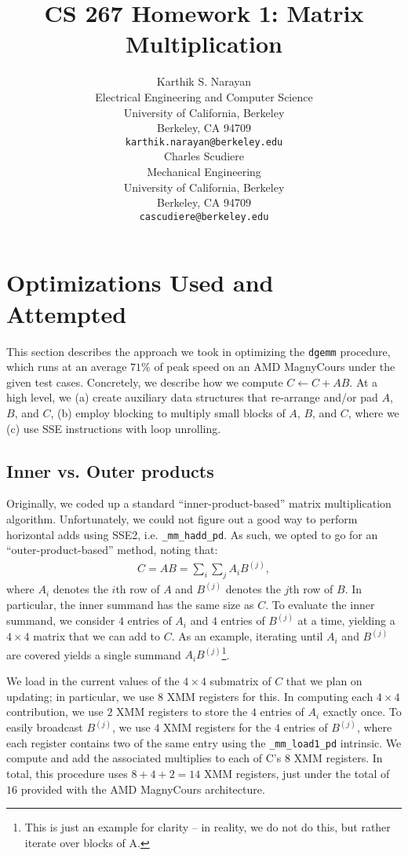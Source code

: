 \documentclass{article} %
\title{CS 267 Homework 1: Matrix Multiplication}
\author{
Karthik S. Narayan \\
Electrical Engineering and Computer Science\\
University of California, Berkeley\\
Berkeley, CA 94709 \\
\texttt{karthik.narayan@berkeley.edu} \\
\And
Charles Scudiere \\
Mechanical Engineering\\
University of California, Berkeley\\
Berkeley, CA 94709 \\
\texttt{cascudiere@berkeley.edu} \\
}
\begin{document}
\newcommand{\dgemm}{\texttt{dgemm}}

\newcommand\todo{\textcolor{red}{TODO}}
\newcommand\tocite{\textcolor{red}{CITE}}

\maketitle

\section{Optimizations Used and Attempted}
This section describes the approach we took in optimizing the \dgemm\; procedure,
which runs at an average $71\%$ of peak speed on an AMD MagnyCours under the
given test cases.
Concretely, we describe how we compute $C \leftarrow C + AB$. At a high level,
we (a) create auxiliary data structures that re-arrange and/or pad $A$, $B$,
and $C$, (b) employ blocking to multiply small blocks of $A$, $B$, and $C$,
where we (c) use SSE instructions with loop unrolling.

\subsection{Inner vs. Outer products}
\label{sec:ioproducts}
Originally, we coded up a standard ``inner-product-based'' matrix multiplication
algorithm. Unfortunately, we could not figure out a good way to perform
horizontal adds using SSE2, i.e. \texttt{\_mm\_hadd\_pd}. As such, we opted to go
for an ``outer-product-based'' method, noting that:
\begin{align}
  \label{eq:matmul}
  C = AB = \sum_{i}\sum_{j}A_i B^{(j)},
\end{align}
where $A_i$ denotes the $i$th row of $A$ and $B^{(j)}$ denotes the $j$th row of
$B$. In particular, the inner summand has the same size as $C$. To evaluate the
inner summand, we consider $4$ entries of $A_i$ and $4$ entries of $B^{(j)}$ at
a time, yielding a $4\times 4$ matrix that we can add to $C$. As an example,
iterating until $A_i$ and $B^{(j)}$ are covered yields a single summand
$A_i B^{(j)}$\footnote{This is just an example for clarity -- in reality, we do
  not do this, but rather iterate over blocks of A.}.

We load in the current values of the $4\times 4$ submatrix of $C$ that we
plan on updating; in particular, we use $8$ XMM registers for this.
In computing each $4\times 4$ contribution, we use $2$ XMM registers to store
the $4$ entries of $A_i$ exactly once. To easily broadcast $B^{(j)}$, we use
$4$ XMM registers for the $4$ entries of $B^{(j)}$, where each register contains
two of the same entry using the \texttt{\_mm\_load1\_pd} intrinsic. We compute
and add the associated multiplies to each of C's $8$ XMM registers. In total,
this procedure uses $8 + 4 + 2 = 14$ XMM registers, just under the total of $16$
provided with the AMD MagnyCours architecture.
\end{document}
